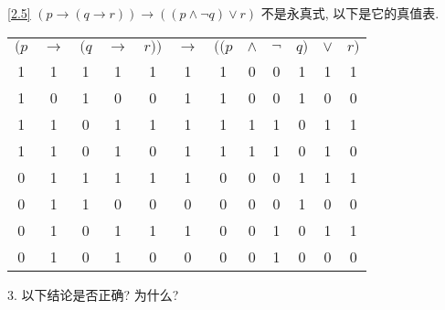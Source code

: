 \documentclass[boxes]{homework}
\begin{document}
\begin{solution}
\begin{center}
\begin{tabular}{cccc|c|ccccccccc}
        \end{tabular}
    \end{center}
    \ref{2.5} $(p\to(q\to r))\to((p\land\lnot q)\lor r)$ 不是永真式, 以下是它的真值表.
    \begin{center}
        \begin{tabular}{ccccc|c|cccccc}
            $(p$ & $\to$ & $(q$ & $\to$ & $r))$ & $\to$ & $((p$ & $\land$ & $\lnot$ & $q)$ & $\lor$ & $r)$ \\
            1    & 1     & 1    & 1     & 1     & 1     & 1     & 0       & 0       & 1    & 1      & 1    \\
            1    & 0     & 1    & 0     & 0     & 1     & 1     & 0       & 0       & 1    & 0      & 0    \\
            1    & 1     & 0    & 1     & 1     & 1     & 1     & 1       & 1       & 0    & 1      & 1    \\
            1    & 1     & 0    & 1     & 0     & 1     & 1     & 1       & 1       & 0    & 1      & 0    \\
            0    & 1     & 1    & 1     & 1     & 1     & 0     & 0       & 0       & 1    & 1      & 1    \\
            0    & 1     & 1    & 0     & 0     & 0     & 0     & 0       & 0       & 1    & 0      & 0    \\
            0    & 1     & 0    & 1     & 1     & 1     & 0     & 0       & 1       & 0    & 1      & 1    \\
            0    & 1     & 0    & 1     & 0     & 0     & 0     & 0       & 1       & 0    & 0      & 0
        \end{tabular}
    \end{center}
\end{solution}
\begin{problem}
3. 以下结论是否正确? 为什么?
\end{problem}
\end{document}
